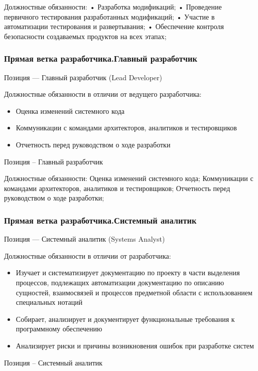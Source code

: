 \documentclass{../industrial-development}
\begin{document}
Должностные обязанности:
• Разработка модификаций;
• Проведение первичного тестирования разработанных модификаций;
• Участие в автоматизации тестирования и развертывания;
• Обеспечение контроля безопасности создаваемых продуктов на всех этапах;

\begin{frame} \frametitle{Прямая ветка разработчика.Главный разработчик}
 \begin{block}{}
  \alert{Позиция --- Главный разработчик (Lead Developer)}

Должностные обязанности в отличии от ведущего разработчика: 
  \end{block}
  \begin{itemize}
  \item Оценка изменений системного кода
  \item Коммуникации с командами архитекторов, аналитиков и тестировщиков
 \item  Отчетность перед руководством о ходе разработки
  \end{itemize}
\end{frame}

\lecturenotes
Позиция – Главный разработчик

Должностные обязанности:
Оценка изменений системного кода;
Коммуникации с командами архитекторов, аналитиков и тестировщиков;
Отчетность перед руководством о ходе разработки; 

\begin{frame} \frametitle{Прямая ветка разработчика.Системный аналитик}
 \begin{block}{}
  \alert{Позиция --- Системный аналитик (Systems Analyst)}

Должностные обязанности в отличии от разработчика: 
  \end{block}
  \begin{itemize}
\item  Изучает и систематизирует документацию по проекту в части выделения процессов, подлежащих автоматизации
   документацию по описанию сущностей, взаимосвязей и процессов предметной области с использованием специальных нотаций
  \item Собирает, анализирует и документирует функциональные требования к программному обеспечению
 \item  Анализирует риски и причины возникновения ошибок при разработке систем
  \end{itemize}
\end{frame}

\lecturenotes
Позиция – Системный аналитик
\end{document}
